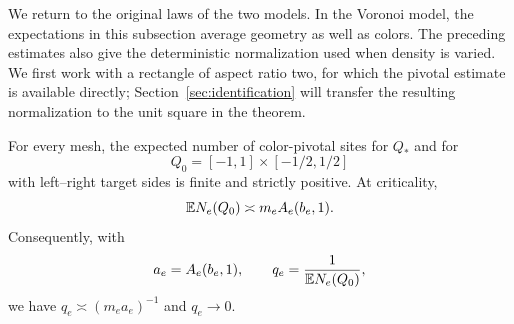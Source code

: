 We return to the original laws of the two models.  In the Voronoi
model, the expectations in this subsection average geometry as well
as colors.  The preceding estimates also give the deterministic
normalization used when density is varied.  We first work with a rectangle of
aspect ratio two, for which the pivotal estimate is available
directly; Section~\ref{sec:identification} will transfer the resulting
normalization to the unit square in the theorem.

\begin{lemma}\label{lem:pivotal-scale}
For every mesh, the expected number of color-pivotal sites for $Q_*$
and for
\[
 Q_0=[-1,1]\times[-1/2,1/2]
\]
with left--right target sides is finite and strictly positive.  At
criticality,
\begin{equation}\label{eq:aux-pivotal-scale}
 \mathbb E N_e(Q_0)\asymp m_e A_e(b_e,1).
\end{equation}
Consequently, with
\begin{equation}\label{eq:aux-scale-def}
 a_e=A_e(b_e,1),\qquad q_e=\frac1{\mathbb E N_e(Q_0)},
\end{equation}
we have $q_e\asymp(m_ea_e)^{-1}$ and $q_e\to0$.
\end{lemma}

